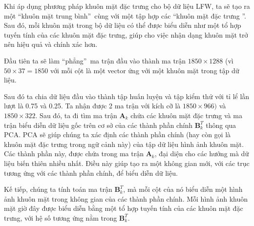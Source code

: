\documentclass[12pt,a4paper,oneside]{report}
\numberwithin{equation}{section}
\begin{document}
Khi áp dụng phương pháp khuôn mặt đặc trưng cho bộ dữ liệu LFW, ta sẽ tạo ra một \textquotedblleft khuôn mặt trung bình\textquotedblright\ cùng với một tập hợp các \textquotedblleft khuôn mặt đặc trưng \textquotedblright. Sau đó, mỗi khuôn mặt trong bộ dữ liệu có thể được biểu diễn như một tổ hợp tuyến tính của các khuôn mặt đặc trưng, giúp cho việc nhận dạng khuôn mặt trở nên hiệu quả và chính xác hơn.

Đầu tiên ta sẽ làm \textquotedblleft phẳng\textquotedblright\ ma trận đầu vào thành ma trận $1850\times1288$ (vì $50\times37=1850$ với mỗi cột là một vector ứng với một khuôn mặt trong tập dữ liệu.

Sau đó ta chia dữ liệu đầu vào thành tập huấn luyện và tập kiểm thử với tỉ lể lần lượt là 0.75 và 0.25. Ta nhận được 2 ma trận với kích cỡ là $1850 \times966)$ và $1850\times322$.
Sau đó, ta đi tìm ma trận $\mathbf{A}_k$ chứa các khuôn mặt đặc trưng và ma trận biểu diễn dữ liệu gốc trên cơ sở của các thành phần chính $\mathbf{B}_k^T$ thông qua PCA.
PCA sẽ giúp chúng ta xác định các thành phần chính (hay còn gọi là khuôn mặt đặc trưng trong ngữ cảnh này) của tập dữ liệu hình ảnh khuôn mặt. Các thành phần này, được chứa trong ma trận $\mathbf{A}_k$, đại diện cho các hướng mà dữ liệu biến thiên nhiều nhất. Điều này giúp tạo ra một không gian mới, với các trục tương ứng với các thành phần chính, để biểu diễn dữ liệu.

Kế tiếp, chúng ta tính toán ma trận $\mathbf{B}_k^T$, mà mỗi cột của nó biểu diễn một hình ảnh khuôn mặt trong không gian của các thành phần chính. Mỗi hình ảnh khuôn mặt giờ đây được biểu diễn bằng một tổ hợp tuyến tính của các khuôn mặt đặc trưng, với hệ số tương ứng nằm trong $\mathbf{B}_k^T$.
\end{document}
